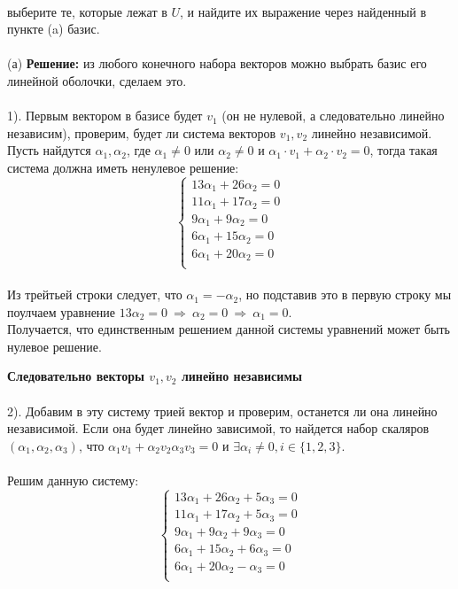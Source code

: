\documentclass[a4paper, 12pt]{article}
\begin{document}
    \\ выберите те, которые лежат в $U$, и найдите их выражение через найденный в пункте (a) базис.
    \\
    \\ (а) \textbf{Решение: } из любого конечного набора векторов можно выбрать базис его линейной оболочки, сделаем это.
    \\
    \\ 1). Первым вектором в базисе будет $v_1$ (он не нулевой, а следовательно линейно независим), проверим, будет ли система векторов $v_1, v_2$ линейно независимой. Пусть найдутся $\alpha_1, \alpha_2$, где $\alpha_1 \neq 0$ или $\alpha_2 \neq 0$ и $\alpha_1 \cdot v_1 + \alpha_2 \cdot v_2 = 0$, тогда такая система должна иметь ненулевое решение:
    \begin{equation*}
        \begin{cases}
            13\alpha_1 + 26\alpha_2 = 0 \\
            11\alpha_1 + 17\alpha_2 = 0 \\
            9\alpha_1 + 9\alpha_2 = 0 \\
            6\alpha_1 + 15\alpha_2 = 0 \\
            6\alpha_1 + 20\alpha_2 = 0 \\
        \end{cases}
    \end{equation*}
    \\ Из трейтьей строки следует, что $\alpha_1 = -\alpha_2$, но подставив это в первую строку мы поулчаем уравнение $13\alpha_2 = 0 \ \Rightarrow \ \alpha_2 = 0 \ \Rightarrow \ \alpha_1 = 0$.
    \\ Получается, что единственным решением данной системы уравнений может быть нулевое решение. \par \textbf{Следовательно векторы $v_1, v_2$ линейно независимы}
    \\
    \\ 2). Добавим в эту систему трией вектор и проверим, останется ли она линейно независимой. Если она будет линейно зависимой, то найдется набор скаляров $(\alpha_1, \alpha_2, \alpha_3)$, что $\alpha_1 v_1 + \alpha_2 v_2 \alpha_3 v_3 = 0$ и $\exists \alpha_i \neq 0, i \in \{1, 2, 3\}$.
    \\
    \\ Решим данную систему:
    \begin{equation*}
        \begin{cases}
            13\alpha_1 + 26\alpha_2 + 5\alpha_3 = 0 \\
            11\alpha_1 + 17\alpha_2 + 5\alpha_3 = 0 \\
            9\alpha_1 + 9\alpha_2 + 9\alpha_3 = 0 \\
            6\alpha_1 + 15\alpha_2 + 6\alpha_3 = 0 \\
            6\alpha_1 + 20\alpha_2 -\alpha_3 = 0 \\
        \end{cases}
    \end{equation*}
\end{document}
